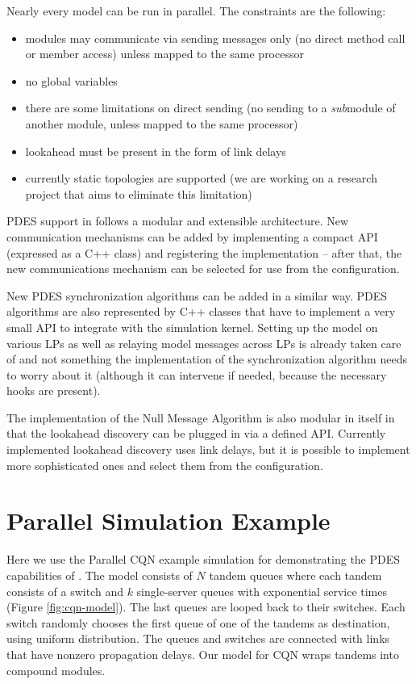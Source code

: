 Nearly every model can be run in parallel. The constraints are the following:
\begin{itemize}
  \item{modules may communicate via sending messages only (no direct method call
        or member access) unless mapped to the same processor}
  \item{no global variables}
  \item{there are some limitations on direct sending (no sending to a \textit{sub}module
        of another module, unless mapped to the same processor)}
  \item{lookahead must be present in the form of link delays}
  \item{currently static topologies are supported (we are working on a
      research project that aims to eliminate this limitation)}
\end{itemize}

PDES support in {\opp} follows a modular and extensible architecture.
New communication mechanisms can be added by implementing a compact
API (expressed as a C++ class) and registering the implementation --
after that, the new communications mechanism can be selected for use
from the configuration.

New PDES synchronization algorithms can be added in a similar way.
PDES algorithms are also represented by C++ classes that have
to implement a very small API
to integrate with the simulation kernel.
Setting up the model on various LPs as well as relaying
model messages across LPs is already taken care of and
not something the implementation of the synchronization algorithm
needs to worry about it (although it can intervene if needed,
because the necessary hooks are present).

The implementation of the Null Message Algorithm is also
modular in itself in that the lookahead discovery can be plugged
in via a defined API. Currently implemented lookahead
discovery uses link delays, but it is possible to
implement more sophisticated ones and select them from the
configuration.



\section{Parallel Simulation Example}

Here we use the Parallel CQN example simulation for demonstrating the
PDES capabilities of {\opp}.
The model consists of $N$ tandem queues where each tandem consists
of a switch and $k$ single-server queues with exponential service times
(Figure \ref{fig:cqn-model}).
The last queues are looped back to their switches. Each switch
randomly chooses the first queue of one of the tandems as destination,
using uniform distribution. The queues and switches are connected
with links that have nonzero propagation delays.
Our {\opp} model for CQN wraps tandems into compound modules.



